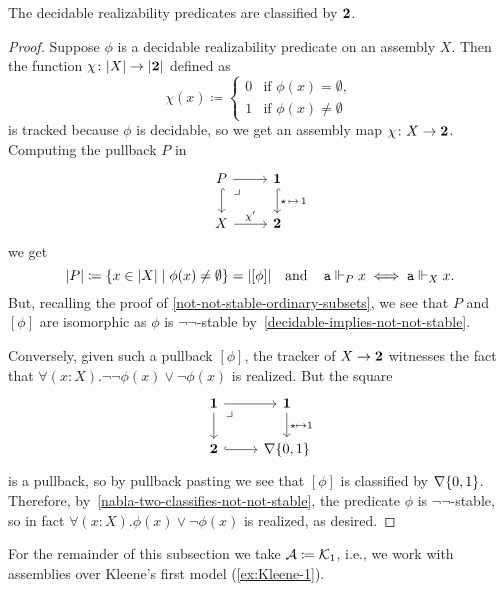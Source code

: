 \begin{proposition}
  The decidable realizability predicates are classified by \(\mathbf 2\).
\end{proposition}
\begin{proof}
  Suppose \(\phi\) is a decidable realizability predicate on an assembly \(X\).
  Then the function \(\chi \colon \lvert X\rvert \to \lvert\mathbf 2\rvert\) defined as
  \[
    \chi(x) \coloneqq
    \begin{cases}
      0 &\text{if } \phi(x) = \emptyset, \\
          1 &\text{if } \phi(x) \neq \emptyset
    \end{cases}
  \]
  is tracked because \(\phi\) is decidable, so we get an assembly map
  \(\chi \colon X \to \mathbf 2\).
  Computing the pullback \(P\) in
  \[
    \begin{tikzcd}
      P \ar[r] \ar[d,hookrightarrow] \pbcorner
      & \One \ar[d,hookrightarrow,"{\singleton \,\mapsto\, 1}"] \\
      X \ar[r,"\chi'"] & \Two
    \end{tikzcd}
  \]
  we get
  \[
    \lvert P\rvert \coloneqq \{x \in \lvert X\rvert \mid \phi(x) \neq \emptyset\}
    = \lvert[\phi]\rvert
    \quad\text{and}\quad
    \operatorname{\mathtt{a}} \Vdash_P x \iff \operatorname{\mathtt{a}} \Vdash_X x.
  \]
  But, recalling the proof of \cref{not-not-stable-ordinary-subsets}, we see
  that \(P\) and \([\phi]\) are isomorphic as \(\phi\) is \(\lnot\lnot\)-stable
  by~\cref{decidable-implies-not-not-stable}.

  Conversely, given such a pullback \([\phi]\), the tracker of \(X \to \mathbf 2\)
  witnesses the fact that \(\forall(x:X).\lnot\lnot\phi(x) \lor \lnot\phi(x)\)
  is realized.
  But the square
  \[
    \begin{tikzcd}
      \One \pbcorner \ar[r] \ar[d] & \One \ar[d,"\star \mapsto 1"] \\
      \Two \ar[r,hookrightarrow] & \nabla\set{0,1}
    \end{tikzcd}
  \]
  is a pullback, so by pullback pasting we see that \([\phi]\) is classified by
  \(\nabla\{0,1\}\). Therefore, by~\cref{nabla-two-classifies-not-not-stable},
  the predicate \(\phi\) is \(\lnot\lnot\)-stable, so in fact
  \(\forall(x:X).\phi(x) \lor \lnot\phi(x)\) is realized, as desired.
\end{proof}

For the remainder of this subsection we take \(\mathcal A \coloneqq \mathcal{K}_1\), i.e., we
work with assemblies over Kleene's first model (\cref{ex:Kleene-1}).

